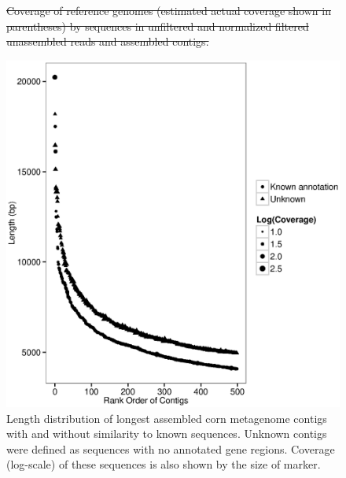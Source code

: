 \documentclass{pnastwo}
\providecommand{\DIFdel}[1]{{\protect\color{red}\sout{#1}}}                      %
\providecommand{\DIFdelFL}[1]{\DIFdel{#1}} %
\providecommand{\DIFdelbeginFL}{} %
\providecommand{\DIFdelendFL}{} %
\begin{document}
\begin{figure}
\DIFdelbeginFL %
{%
\DIFdelFL{Coverage of reference genomes (estimated actual coverage shown in parentheses) by sequences in unfiltered and normalized filtered unassembled reads and assembled contigs.}}

\DIFdelendFL \begin{center}
\centerline{\includegraphics[width=.7\textwidth]{./figures/corn-cov-len-500.eps}}
\caption{Length distribution of longest assembled corn metagenome contigs with and without similarity to known sequences.  Unknown contigs were defined as sequences with no annotated gene regions.  Coverage (log-scale) of these sequences is also shown by the size of marker. }
\label{cornlength}
\end{center}
\end{figure}
\end{document}
